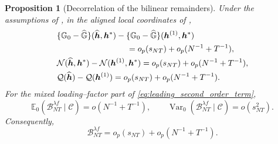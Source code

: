 \documentclass[11pt]{article}
\numberwithin{equation}{section}
\newtheorem{proposition}{Proposition}
\theoremstyle{remark}
\newcommand{\Ezero}{\mathbb E_0}
\begin{document}
\begin{proposition}[Decorrelation of the bilinear remainders]
\label{prop:bilinear_decorrelation}
Under the assumptions of , in the aligned local coordinates of ,
\begin{align}
&\{\mathbb G_0-\widehat{\mathbb G}\}
(\widehat{\bm h},\bm h^*)
-
\{\mathbb G_0-\widehat{\mathbb G}\}
(\bm h^{(1)},\bm h^*)
\nonumber\\
&\hspace{30mm}
=o_p(s_{NT})+o_p(N^{-1}+T^{-1}),
\label{eq:gram_bilinear_replacement}\\
&\mathcal N(\widehat{\bm h},\bm h^*)
-
\mathcal N(\bm h^{(1)},\bm h^*)
=
o_p(s_{NT})+o_p(N^{-1}+T^{-1}),
\label{eq:nonlinear_bilinear_replacement}\\
&\mathcal Q(\widehat{\bm h})
-
\mathcal Q(\bm h^{(1)})
=
o_p(s_{NT})+o_p(N^{-1}+T^{-1}).
\label{eq:curvature_bilinear_replacement}
\end{align}
For the mixed loading--factor part of \eqref{eq:leading_second_order_term},
\begin{equation}
\label{eq:mixed_bilinear_decorrelation}
\Ezero(\mathcal B_{NT}^{\lambda f}\mid\mathscr C)
=
o(N^{-1}+T^{-1}),
\qquad
\operatorname{Var}_0(
\mathcal B_{NT}^{\lambda f}
\mid\mathscr C)
=
o(s_{NT}^2).
\end{equation}
Consequently,
$$
\mathcal B_{NT}^{\lambda f}
=
o_p(s_{NT})
+
o_p(N^{-1}+T^{-1}).
$$
\end{proposition}
\end{document}
